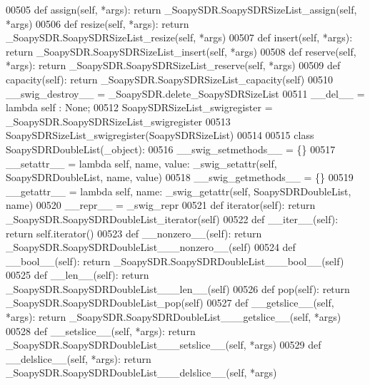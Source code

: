 \begin{DoxyCode}
{{{{00505     \textcolor{keyword}{def }assign(self, *args): \textcolor{keywordflow}{return} \_SoapySDR.SoapySDRSizeList\_assign(self, *args)
00506     \textcolor{keyword}{def }resize(self, *args): \textcolor{keywordflow}{return} \_SoapySDR.SoapySDRSizeList\_resize(self, *args)
00507     \textcolor{keyword}{def }insert(self, *args): \textcolor{keywordflow}{return} \_SoapySDR.SoapySDRSizeList\_insert(self, *args)
00508     \textcolor{keyword}{def }reserve(self, *args): \textcolor{keywordflow}{return} \_SoapySDR.SoapySDRSizeList\_reserve(self, *args)
00509     \textcolor{keyword}{def }capacity(self): \textcolor{keywordflow}{return} \_SoapySDR.SoapySDRSizeList\_capacity(self)
00510     \_\_swig\_destroy\_\_ = \_SoapySDR.delete\_SoapySDRSizeList
00511     \_\_del\_\_ = \textcolor{keyword}{lambda} self : \textcolor{keywordtype}{None};
00512 SoapySDRSizeList\_swigregister = \_SoapySDR.SoapySDRSizeList\_swigregister
00513 SoapySDRSizeList_swigregister(SoapySDRSizeList)
00514 
00515 \textcolor{keyword}{class }SoapySDRDoubleList(_object):
00516     \_\_swig\_setmethods\_\_ = \{\}
00517     \_\_setattr\_\_ = \textcolor{keyword}{lambda} self, name, value: _swig_setattr(self, SoapySDRDoubleList, name, value)
00518     \_\_swig\_getmethods\_\_ = \{\}
00519     \_\_getattr\_\_ = \textcolor{keyword}{lambda} self, name: _swig_getattr(self, SoapySDRDoubleList, name)
00520     \_\_repr\_\_ = \_swig\_repr
00521     \textcolor{keyword}{def }iterator(self): \textcolor{keywordflow}{return} \_SoapySDR.SoapySDRDoubleList\_iterator(self)
00522     \textcolor{keyword}{def }__iter__(self): \textcolor{keywordflow}{return} self.iterator()
00523     \textcolor{keyword}{def }__nonzero__(self): \textcolor{keywordflow}{return} \_SoapySDR.SoapySDRDoubleList\_\_\_nonzero\_\_(self)
00524     \textcolor{keyword}{def }__bool__(self): \textcolor{keywordflow}{return} \_SoapySDR.SoapySDRDoubleList\_\_\_bool\_\_(self)
00525     \textcolor{keyword}{def }__len__(self): \textcolor{keywordflow}{return} \_SoapySDR.SoapySDRDoubleList\_\_\_len\_\_(self)
00526     \textcolor{keyword}{def }pop(self): \textcolor{keywordflow}{return} \_SoapySDR.SoapySDRDoubleList\_pop(self)
00527     \textcolor{keyword}{def }__getslice__(self, *args): \textcolor{keywordflow}{return} \_SoapySDR.SoapySDRDoubleList\_\_\_getslice\_\_(self, *args)
00528     \textcolor{keyword}{def }__setslice__(self, *args): \textcolor{keywordflow}{return} \_SoapySDR.SoapySDRDoubleList\_\_\_setslice\_\_(self, *args)
00529     \textcolor{keyword}{def }__delslice__(self, *args): \textcolor{keywordflow}{return} \_SoapySDR.SoapySDRDoubleList\_\_\_delslice\_\_(self, *args)
}}}}
\end{DoxyCode}

